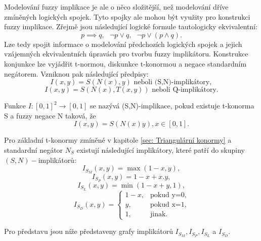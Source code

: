 Modelov\'an\'i fuzzy implikace je ale o něco složitější, než modelov\'an\'i dříve zmíněných logických spojek. Tyto spojky ale mohou být využity pro konstrukci fuzzy implikace. Zřejmě jsou následující logické formule tautologicky ekvivalentní: $$ p\implies q, \mbox{   } \neg p \vee q, \mbox{   } \neg p\vee (p\wedge q) .$$ Lze tedy spojit informace o modelov\'an\'i p\v redchozích logických spojek a jejich vzájemných ekvivalentních \' upravách pro tvorbu fuzzy implikátoru. Konstrukce konjunkce lze vyjádřit t-normou, diskunkce t-konormou a negace standardn\'im negátorem. Vzniknou pak n\'asleduj\'ic\'i p\v redpisy:
$$I(x,y)=S(N(x),y)\text{ neboli (S,N)-implikátory},$$
$$I(x,y)=S(N(x),T(x,y)) \text{ neboli Q-implikátory}.$$

\begin{definition}
    \cite{Springer}
    Funkce $I: [0,1]^2 \rightarrow [0,1]$ se nazývá (S,N)-implikace, pokud existuje t-konorma S a fuzzy negace N taková, že $$I(x,y) = S(N(x)y), x \in [0,1].$$
\end{definition}

\begin{example}
\cite{Springer}
Pro základní t-konormy zmíněné v kapitole \ref{sec: Triangulární konormy} a standardní negátor $N_S$ existují následující implikátory, které patří do skupiny $(S,N)-$implikátor\r u:\\
    \vbox{$$ I_{S_M}(x,y)=\max(1-x,y),$$ }
\vbox{$$ I_{S_P}(x,y)=1-x+x.y,$$}
 \vbox{$$ I_{S_L}(x,y)=\min(1-x+y,1),$$}
 $$ I_{S_D}(x,y)=\begin{cases} 1-x,
&\mbox {pokud y=0,} \\y, &\mbox {pokud x=1}, \\
1, &\mbox {jinak.} \end{cases} $$
\end{example}

Pro představu jsou níže představeny grafy implikátorů $I_{S_M}, I_{S_P}, I_{S_L}$ a $I_{S_D}.$


